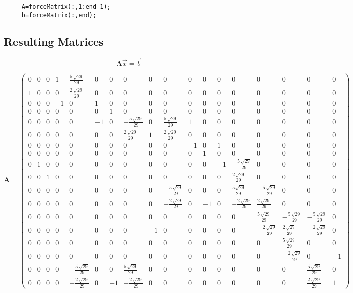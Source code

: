 \documentclass[9pt,letterpaper]{article}
\begin{document}
	 \begin{verbatim}
	 A=forceMatrix(:,1:end-1);
	 b=forceMatrix(:,end);
	 \end{verbatim} 
	 \newpage
	 \subsection{Resulting Matrices} 
	 
\[ \mathbf{A}\vec{x}=\vec{b} \]
	
 \[	\mathbf{A}=\left(\begin{array}{cccccccccccccccccc} 0 & 0 & 0 & 1 & \frac{5\,\sqrt{29}}{29} & 0 & 0 & 0 & 0 & 0 & 0 & 0 & 0 & 0 & 0 & 0 & 0 & 0\\ 1 & 0 & 0 & 0 & \frac{2\,\sqrt{29}}{29} & 0 & 0 & 0 & 0 & 0 & 0 & 0 & 0 & 0 & 0 & 0 & 0 & 0\\ 0 & 0 & 0 & -1 & 0 & 1 & 0 & 0 & 0 & 0 & 0 & 0 & 0 & 0 & 0 & 0 & 0 & 0\\ 0 & 0 & 0 & 0 & 0 & 0 & 1 & 0 & 0 & 0 & 0 & 0 & 0 & 0 & 0 & 0 & 0 & 0\\ 0 & 0 & 0 & 0 & 0 & -1 & 0 & -\frac{5\,\sqrt{29}}{29} & 0 & \frac{5\,\sqrt{29}}{29} & 1 & 0 & 0 & 0 & 0 & 0 & 0 & 0\\ 0 & 0 & 0 & 0 & 0 & 0 & 0 & \frac{2\,\sqrt{29}}{29} & 1 & \frac{2\,\sqrt{29}}{29} & 0 & 0 & 0 & 0 & 0 & 0 & 0 & 0\\ 0 & 0 & 0 & 0 & 0 & 0 & 0 & 0 & 0 & 0 & -1 & 0 & 1 & 0 & 0 & 0 & 0 & 0\\ 0 & 0 & 0 & 0 & 0 & 0 & 0 & 0 & 0 & 0 & 0 & 1 & 0 & 0 & 0 & 0 & 0 & 0\\ 0 & 1 & 0 & 0 & 0 & 0 & 0 & 0 & 0 & 0 & 0 & 0 & -1 & -\frac{5\,\sqrt{29}}{29} & 0 & 0 & 0 & 0\\ 0 & 0 & 1 & 0 & 0 & 0 & 0 & 0 & 0 & 0 & 0 & 0 & 0 & \frac{2\,\sqrt{29}}{29} & 0 & 0 & 0 & 0\\ 0 & 0 & 0 & 0 & 0 & 0 & 0 & 0 & 0 & -\frac{5\,\sqrt{29}}{29} & 0 & 0 & 0 & \frac{5\,\sqrt{29}}{29} & -\frac{5\,\sqrt{29}}{29} & 0 & 0 & 0\\ 0 & 0 & 0 & 0 & 0 & 0 & 0 & 0 & 0 & -\frac{2\,\sqrt{29}}{29} & 0 & -1 & 0 & -\frac{2\,\sqrt{29}}{29} & \frac{2\,\sqrt{29}}{29} & 0 & 0 & 0\\ 0 & 0 & 0 & 0 & 0 & 0 & 0 & 0 & 0 & 0 & 0 & 0 & 0 & 0 & \frac{5\,\sqrt{29}}{29} & -\frac{5\,\sqrt{29}}{29} & -\frac{5\,\sqrt{29}}{29} & 0\\ 0 & 0 & 0 & 0 & 0 & 0 & 0 & 0 & -1 & 0 & 0 & 0 & 0 & 0 & -\frac{2\,\sqrt{29}}{29} & \frac{2\,\sqrt{29}}{29} & -\frac{2\,\sqrt{29}}{29} & 0\\ 0 & 0 & 0 & 0 & 0 & 0 & 0 & 0 & 0 & 0 & 0 & 0 & 0 & 0 & 0 & \frac{5\,\sqrt{29}}{29} & 0 & 0\\ 0 & 0 & 0 & 0 & 0 & 0 & 0 & 0 & 0 & 0 & 0 & 0 & 0 & 0 & 0 & -\frac{2\,\sqrt{29}}{29} & 0 & -1\\ 0 & 0 & 0 & 0 & -\frac{5\,\sqrt{29}}{29} & 0 & 0 & \frac{5\,\sqrt{29}}{29} & 0 & 0 & 0 & 0 & 0 & 0 & 0 & 0 & \frac{5\,\sqrt{29}}{29} & 0\\ 0 & 0 & 0 & 0 & -\frac{2\,\sqrt{29}}{29} & 0 & -1 & -\frac{2\,\sqrt{29}}{29} & 0 & 0 & 0 & 0 & 0 & 0 & 0 & 0 & \frac{2\,\sqrt{29}}{29} & 1 \end{array}\right) \]
\end{document}
